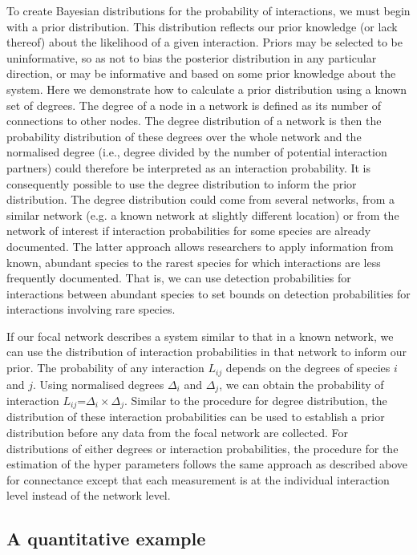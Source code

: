 \documentclass[12pt]{article}
\begin{document}
    To create Bayesian distributions for the probability of interactions, we must begin with a prior distribution. This distribution reflects our prior knowledge (or lack thereof) about the likelihood of a given interaction. Priors may be selected to be uninformative, so as not to bias the posterior distribution in any particular direction, or may be informative and based on some prior knowledge about the system. Here we demonstrate how to calculate a prior distribution using a known set of degrees. The degree of a node in a network is defined as its number of connections to other nodes. The degree distribution of a network is then the probability distribution of these degrees over the whole network and the normalised degree (i.e., degree divided by the number of potential interaction partners) could therefore be interpreted as an interaction probability. It is consequently possible to use the degree distribution to inform the prior distribution. The degree distribution could come from several networks, from a similar network (e.g. a known network at slightly different location) or from the network of interest if interaction probabilities for some species are already documented. The latter approach allows researchers to apply information from known, abundant species to the rarest species for which interactions are less frequently documented. That is, we can use detection probabilities for interactions between abundant species to set bounds on detection probabilities for interactions involving rare species.


    If our focal network describes a system similar to that in a known network, we can use the distribution of interaction probabilities in that network to inform our prior. The probability of any interaction $L_{ij}$ depends on the degrees of species $i$ and $j$. Using normalised degrees $\Delta_i$ and $\Delta_j$, we can obtain the probability of interaction $L_{ij}$=$\Delta_i\times\Delta_j$. Similar to the procedure for degree distribution, the distribution of these interaction probabilities can be used to establish a prior distribution before any data from the focal network are collected. For distributions of either degrees or interaction probabilities, the procedure for the estimation of the hyper parameters follows the same approach as described above for connectance except that each measurement is at the individual interaction level instead of the network level.


    \subsection*{A quantitative example}
\end{document}
